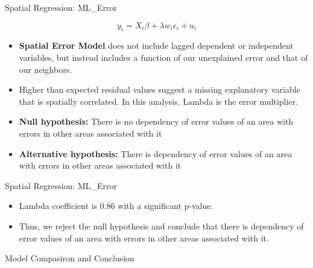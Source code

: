 \documentclass[10pt, aspectratio=169]{beamer}
\begin{document}
\begin{frame}{Spatial Regression: ML\_Error}

    \begin{equation} 
        y_i=X_i \beta+\lambda w_i \epsilon_i+u_i
    \end{equation}
    
    \begin{itemize}
         
        \item \textbf{Spatial Error Model} does not include lagged dependent or independent variables, but instead includes a function of our unexplained error and that of our neighbors.
        \item \textbf{}Higher than expected residual values suggest a missing explanatory variable that is spatially correlated. In this analysis, Lambda is the error multiplier.
        \item \textbf{Null hypothesis:} There is no dependency of error values of an area with errors in other areas associated with it
        \item \textbf{Alternative hypothesis:} There is dependency of error values of an area with errors in other areas associated with it
        
    \end{itemize}
\end{frame}

\begin{frame}{Spatial Regression: ML\_Error}
    \small\begin{table}[!h]
        
        \caption{\label{tab:ml_error_summary} Estimation results of ML\_Error regression.}
    \end{table}
    \begin{itemize}
         
        \item \textbf{}Lambda coefficient is 0.86 with a significant p-value.
        \item \textbf{}Thus, we reject the null hypothesis and conclude that there is dependency of error values of an area with errors in other areas associated with it.
              
    \end{itemize}
    
\end{frame}

\begin{frame}{Model Compasiron and Conclusion}


    \small\begin{table}[!h]
        
        \caption{\label{tab:ml_lag_stats} Statistics of ML\_Lag model.}
    \end{table}

    \small\begin{table}[!h]
        
        \caption{\label{tab:ml_error_stats} Statistics of ML\_Error model.}
    \end{table}
    
\end{frame}
\end{document}
